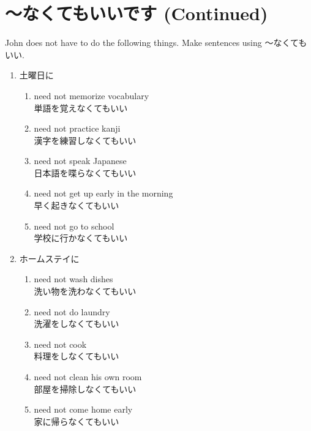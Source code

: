 \documentclass[notoc,notitlepage]{tufte-book}
\begin{document}
\section{〜なくてもいいです (Continued)}%
\label{sec:_nakutemoiidesu_continued}

\begin{eg}
  John does not have to do the following things. Make sentences using 〜なくてもいい.

  \begin{enumerate}
    \item 土曜日に
      \begin{enumerate}
        \item need not memorize vocabulary \\
          単語を覚えなくてもいい
        \item need not practice kanji \\
          漢字を練習しなくてもいい
        \item need not speak Japanese \\
          日本語を喋らなくてもいい
        \item need not get up early in the morning \\
          早く起きなくてもいい
        \item need not go to school \\
          学校に行かなくてもいい
      \end{enumerate}
    \item ホームステイに
      \begin{enumerate}
        \item need not wash dishes \\
          洗い物を洗わなくてもいい
        \item need not do laundry \\
          洗濯をしなくてもいい
        \item need not cook \\
          料理をしなくてもいい
        \item need not clean his own room \\
          部屋を掃除しなくてもいい
        \item need not come home early \\
          家に帰らなくてもいい
      \end{enumerate}
  \end{enumerate}
\end{eg}
\end{document}

